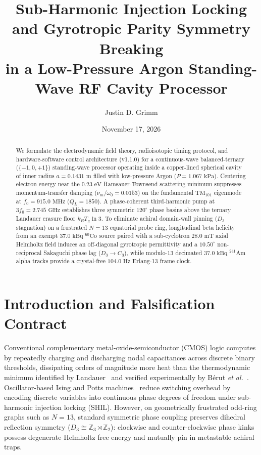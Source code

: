 \documentclass[aps,pra,twocolumn,superscriptaddress,nofootinbib,10pt]{revtex4-2}
\begin{document}
\title{Sub-Harmonic Injection Locking and Gyrotropic Parity Symmetry Breaking\\
in a Low-Pressure Argon Standing-Wave RF Cavity Processor}

\author{Justin D. Grimm}

\date{November 17, 2026}

\begin{abstract}
We formulate the electrodynamic field theory, radioisotopic timing protocol,
and hardware-software control architecture (v1.1.0) for a continuous-wave
balanced-ternary ($\{-1, 0, +1\}$) standing-wave processor operating inside a
copper-lined spherical cavity of inner radius $a = 0.1431\text{ m}$ filled
with low-pressure Argon ($P = 1.067\text{ kPa}$). Centering electron energy
near the $0.23\text{ eV}$ Ramsauer-Townsend scattering minimum suppresses
momentum-transfer damping ($\nu_m / \omega_0 = 0.0153$) on the fundamental
$\text{TM}_{101}$ eigenmode at $f_0 = 915.0\text{ MHz}$ ($Q_L = 1850$). A
phase-coherent third-harmonic pump at $3f_0 = 2.745\text{ GHz}$ establishes
three symmetric $120^\circ$ phase basins above the ternary Landauer erasure
floor $k_B T_g \ln 3$. To eliminate achiral domain-wall pinning ($D_3$
stagnation) on a frustrated $N = 13$ equatorial probe ring, longitudinal
beta helicity from an exempt $37.0\text{ kBq}$ $^{60}\text{Co}$ source paired
with a sub-cyclotron $28.0\text{ mT}$ axial Helmholtz field induces an
off-diagonal gyrotropic permittivity and a $10.50^\circ$ non-reciprocal
Sakaguchi phase lag ($D_3 \to C_3$), while modulo-13 decimated $37.0\text{ kBq}$
$^{241}\text{Am}$ alpha tracks provide a crystal-free $104.0\text{ Hz}$
Erlang-13 frame clock.
\end{abstract}

\maketitle

\section{Introduction and Falsification Contract}

Conventional complementary metal-oxide-semiconductor (CMOS) logic computes by
repeatedly charging and discharging nodal capacitances across discrete binary
thresholds, dissipating orders of magnitude more heat than the thermodynamic
minimum identified by Landauer~\cite{Landauer1961} and verified experimentally
by B\'{e}rut \textit{et al.}~\cite{Berut2012}. Oscillator-based Ising and Potts
machines~\cite{Traversa2015,Wang2019} reduce switching overhead by encoding
discrete variables into continuous phase degrees of freedom under sub-harmonic
injection locking (SHIL). However, on geometrically frustrated odd-ring graphs
such as $N = 13$, standard symmetric phase coupling preserves dihedral
reflection symmetry ($D_3 \cong \mathbb{Z}_3 \rtimes \mathbb{Z}_2$): clockwise
and counter-clockwise phase kinks possess degenerate Helmholtz free energy and
mutually pin in metastable achiral traps.
\end{document}
